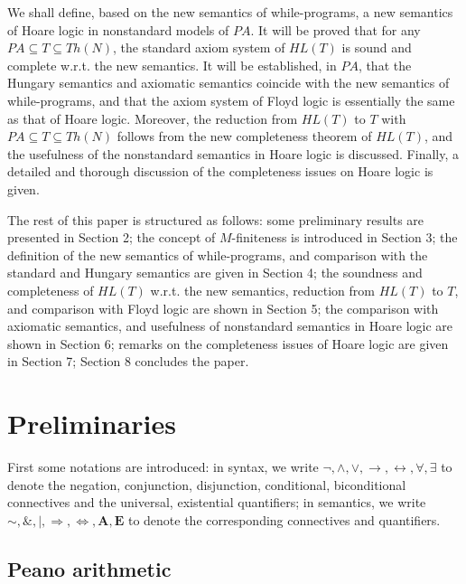 \documentclass[a4paper,11pt]{article}
\begin{document}
We shall define, based on the new semantics of while-programs, a new semantics of Hoare logic in nonstandard models of $PA$. It will be proved that for any $PA\subseteq T \subseteq Th(N)$, the standard axiom system of $HL(T)$ is sound and complete w.r.t. the new semantics. It will be established, in $PA$, that the Hungary semantics and axiomatic semantics coincide with the new semantics of while-programs, and that the axiom system of Floyd logic is essentially the same as that of Hoare logic. Moreover, the reduction from $HL(T)$ to $T$ with $PA \subseteq T \subseteq Th(N)$ follows from the new completeness theorem of $HL(T)$, and the usefulness of the nonstandard semantics in Hoare logic is discussed. Finally, a detailed and thorough discussion of the completeness issues on Hoare logic is given.

The rest of this paper is structured as follows: some preliminary results are presented in Section 2; the concept of $M$-finiteness is introduced in Section 3; the definition of the new semantics of while-programs, and comparison with the standard and Hungary semantics are given in Section 4; the soundness and completeness of $HL(T)$ w.r.t. the new semantics, reduction from $HL(T)$ to $T$, and comparison with Floyd logic are shown in Section 5; the comparison with axiomatic semantics, and usefulness of nonstandard semantics in Hoare logic are shown in Section 6; remarks on the completeness issues of Hoare logic are given in Section 7; Section 8 concludes the paper.

\section{Preliminaries}

First some notations are introduced: in syntax, we write $\neg, \wedge, \vee, \rightarrow, \leftrightarrow, \forall, \exists$ to denote the negation, conjunction, disjunction, conditional, biconditional connectives and the universal, existential quantifiers; in semantics, we write $\sim, \&, |, \Rightarrow, \Leftrightarrow, \textbf{A}, \textbf{E}$ to denote the corresponding connectives and quantifiers.

\subsection{Peano arithmetic}
\end{document}
